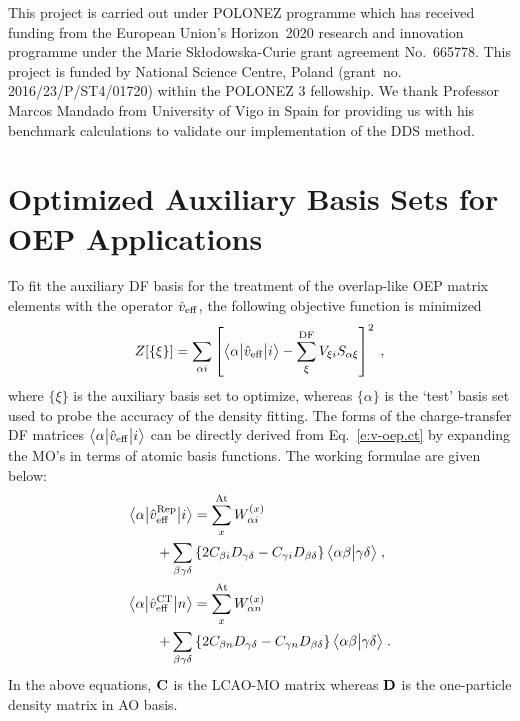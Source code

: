 \begin{acknowledgments}
This project is carried out under POLONEZ programme which has received funding from the European Union's
Horizon~2020 research and innovation programme under the Marie Sk{\l}odowska-Curie grant agreement 
No.~665778. This project is funded by National Science Centre, Poland 
(grant~no. 2016/23/P/ST4/01720) within the POLONEZ 3 fellowship.
We thank Professor Marcos Mandado from University of Vigo in Spain
for providing us with his benchmark calculations to validate our implementation
of the DDS method.
\end{acknowledgments}

\appendix

\section{Optimized Auxiliary Basis Sets for OEP Applications\label{a:auxiliary-basis}}

To fit the auxiliary DF basis for the treatment of the overlap\hyp{}like
OEP matrix elements with the operator $\hat{v}_{\rm eff}$, 
the following objective function is minimized
%
\begin{equation} \label{e:a1-obj}
 Z[\{\xi\}] = \sum_{\alpha i} \left[ 
     \bigl\langle {\alpha} \bigl\lvert {\hat{v}_{\rm eff}} \bigl\lvert {i} \bigr\rangle - 
     \sum_{\xi}^{\rm DF} V_{\xi i} S_{\alpha \xi} 
    \right]^2 \;,
\end{equation}
%
where $\{\xi\}$ is the auxiliary basis set to optimize, whereas $\{\alpha\}$
is the `test' basis set used to probe the accuracy of the density fitting.
The forms of the %
charge\hyp{}transfer DF matrices $\bigl\langle {\alpha} \bigl\lvert {\hat{v}_{\rm eff}} \bigl\lvert {i} \bigr\rangle$
can be directly derived 
from Eq.~\eqref{e:v-oep.ct}
by expanding the MO's in terms of atomic basis functions. The working formulae
are given below:
%
\begin{subequations} \label{e:a1-v.oep}
 \begin{align}
   \bigl\langle {\alpha} \bigl\lvert {\hat{v}_{\rm eff}^{\rm Rep}} \bigl\lvert {i} \bigr\rangle
     &= \sum_{x}^{\rm At} W_{\alpha i}^{(x)} \nonumber   \\ 
        + \sum_{\beta\gamma\delta} &
           \left\{ 
             2 C_{\beta i} D_{\gamma\delta} - C_{\gamma i} D_{\beta \delta}
           \right\}
           \bigl\langle {\alpha\beta} \bigl\lvert {\gamma\delta} \bigr\rangle \;,\\
   \bigl\langle {\alpha} \bigl\lvert {\hat{v}_{\rm eff}^{\rm CT}} \bigl\lvert {n} \bigr\rangle 
     &= \sum_{x}^{\rm At} W_{\alpha n}^{(x)} \nonumber   \\
       + \sum_{\beta\gamma\delta} &
           \left\{
             2 C_{\beta n} D_{\gamma\delta} - C_{\gamma n} D_{\beta \delta}
           \right\}
           \bigl\langle {\alpha\beta} \bigl\lvert {\gamma\delta} \bigr\rangle
    \;.
 \end{align}
\end{subequations}
%
In the above equations, ${\bf C}$ is the LCAO\hyp{}MO matrix whereas ${\bf D}$
is the one\hyp{}particle density matrix in AO basis.

